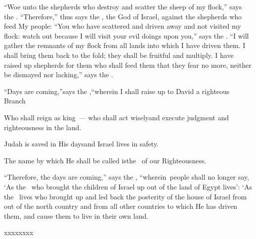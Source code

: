 
\begin{inparaenum}
   ``Woe unto the shepherds who destroy and scatter the sheep of my flock,'' says the \lord.%
   ``Therefore,'' thus says the \lord, the God of Israel, against the shepherds who feed My people: ``You who have scattered and driven away and not visited my flock: watch out because I will visit your evil doings upon you,'' says the \lord.%
   ``I will gather the remnants of my flock from all lands into which I have driven them. I shall bring them back to the fold; they shall be fruitful and multiply.%
   I have raised up shepherds for them who shall feed them that they fear no more, neither be dismayed nor lacking,'' says the \lord.%

  \pa{} ``Days are coming,''\pa{}says the \lord,\pa{}``wherein I shall raise up to David a righteous Branch%

  \pb{}Who shall reign as king~--- who shall act wisely\pa{}and execute judgment and righteousness in the land.%

  \pb{} Judah is saved in His days\pa{}and Israel lives in safety.%

  \pb{}The name by which He shall be called is\pa{}the \lord\ of our Righteousness.%

   ``Therefore, the days are coming,'' says the \lord, ``wherein\understood{}\ people shall no longer say, `As the \lord\ who brought the children of Israel up out of the land of Egypt lives':%
   `As the \lord\ lives who brought up and led back the posterity of the house of Israel from out of the north country and from all other countries to which He has driven them, and cause them to live in their own land.%

  \pb{} %

  \medskip\pa{} %

  \medskip\pa{} %

  \medskip\noindent{} %

  \noindent{} %

  \medskip{} %

  \medskip{} %

  \noindent{} %

  \pe{}xxxx\pa{}xxxx%


  \medskip{} %

\end{inparaenum}
